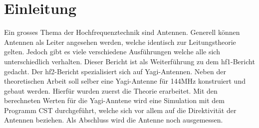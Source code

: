 \section{Einleitung}

Ein grosses Thema der Hochfrequenztechnik sind Antennen. Generell können Antennen als Leiter angesehen werden, welche identisch zur Leitungstheorie gelten. Jedoch gibt es viele verschiedene Ausführungen welche alle sich unterschiedlich verhalten. Dieser Bericht ist als Weiterführung zu dem hf1-Bericht gedacht. Der hf2-Bericht spezialisiert sich auf Yagi-Antennen. Neben der theoretischen Arbeit soll selber eine Yagi-Antenne für 144MHz konstruiert und gebaut werden. Hierfür wurden zuerst die Theorie erarbeitet. Mit den berechneten Werten für die Yagi-Anntene wird eine Simulation mit dem Programm CST durchgeführt, welche sich vor allem auf die Direktivität der Antennen beziehen. Als Abschluss wird die Antenne noch ausgemessen.